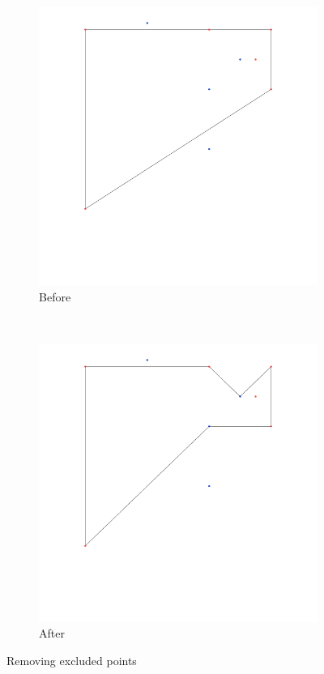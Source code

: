 \documentclass[paper=a4, fontsize=11pt]{scrartcl} %
\numberwithin{equation}{section} %
\numberwithin{figure}{section} %
\numberwithin{table}{section} %
\begin{document}
\begin{figure}[h]
        \centering
        \begin{subfigure}[b]{0.4\textwidth}
                \includegraphics[width=\textwidth]{exc_before}
                \caption{Before}
        \end{subfigure}%
        ~ %
        \begin{subfigure}[b]{0.4\textwidth}
                \includegraphics[width=\textwidth]{exc_after}
                \caption{After}
        \end{subfigure}
        \caption{Removing excluded points}\label{fig:exc}
\end{figure}
\end{document}
